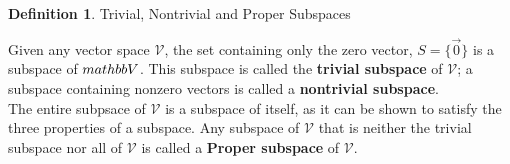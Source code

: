 \documentclass{book}
\theoremstyle{definition}
\newtheorem{definition}{Definition}[section]
\theoremstyle{remark}
\begin{document}
\begin{definition}
Trivial, Nontrivial and Proper Subspaces

    Given any vector space $\mathcal{V}$, the set containing only the zero vector, $S = \{ \vec{0} \}$ is a subspace of $\\mathbb{V}$. This subspace is called the \textbf{trivial subspace} of $\mathcal{V}$; a subspace containing nonzero vectors is called a \textbf{nontrivial subspace}. \\
    
    The entire subpsace of $\mathcal{V}$ is a subspace of itself, as it can be shown to satisfy the three properties of a subspace. Any subspace of $\mathcal{V}$ that is neither the trivial subspace nor all of $\mathcal{V}$ is called a \textbf{Proper subspace}  of $\mathcal{V}$. 
\end{definition}
\end{document}
